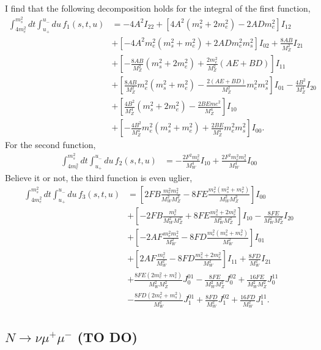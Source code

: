 \documentclass[11pt, a4paper]{article}
\begin{document}
%
I find that the following decomposition holds for the integral of the first
function,
%
\begin{align*}
%
\int_{4m_e^2}^{m_s^2}dt \int_{u_+}^{u_-} du\,f_1(s,t,u) &= -4A^2 I_{22} +
\left[4A^2(m_s^2+2m_e^2) - 2ADm_e^2\right]I_{12}\\
%
~~~~& + \left[ -4A^2m_e^2(m_s^2+m_e^2) + 2ADm_e^2m_s^2\right]I_{02} +
\frac{8AB}{M_Z^2}I_{21}\\
%
~~~~& + \left[ -\frac{8AB}{M_Z^2} (m_s^2+2m_e^2) + \frac{2m_e^2}{M_Z^2} (AE +
BD) \right]I_{11} \\
%
~~~~& + \left[ \frac{8AB}{M_Z^2}m_e^2(m_s^2+m_e^2) -
\frac{2(AE+BD)}{M_Z^2}m_e^2m_s^2 \right]I_{01} - \frac{4B^2}{M_Z^4}I_{20}\\
%
~~~~& + \left[ \frac{4B^2}{M_Z^4} (m_s^2+2m_e^2) -
\frac{2BEme^2}{M_Z^4}\right]I_{10} \\
%
~~~~& + \left[ -\frac{4B^2}{M_Z^4}m_e^2(m_s^2+m_e^2) +
\frac{2BE}{M_Z^4}m_e^2m_s^2 \right]I_{00}. 
%
\end{align*}
%
For the second function,
%
\begin{align*}
%
\int_{4m_e^2}^{m_s^2}dt \int_{u_+}^{u_-} du\,f_2(s,t,u) &=
-\frac{2F^2m_e^2}{M_W^4}I_{10} + \frac{2F^2m_e^2m_s^2}{M_W^4}I_{00}
%
\end{align*}
%
Believe it or not, the third function is even uglier, 
%
\begin{align*}
%
\int_{4m_e^2}^{m_s^2}dt \int_{u_+}^{u_-} du\,f_3(s,t,u) &=
\left[2FB\frac{m_e^2m_s^2}{M_W^2M_Z^2} -
8FE\frac{m_e^2(m_s^2+m_e^2)}{M_W^2M_Z^2}\right]I_{00}\\
%
~~~~&+ \left[-2FB\frac{m_e^2}{M_W^2M_Z^2} +
8FE\frac{m_s^2+2m_e^2}{M_W^2M_Z^2}\right]I_{10} - \frac{8FE}{M_W^2M_Z^2}I_{20}
\\
%
~~~~& + \left[-2AF\frac{m_e^2m_s^2}{M_W^2} -
8FD\frac{m_e^2(m_s^2+m_e^2)}{M_W^2}\right]I_{01}\\
%
~~~~&+ \left[2AF\frac{m_e^2}{M_W^2} -
8FD\frac{m_s^2+2m_e^2}{M_W^2}\right]I_{11} + \frac{8FD}{M_W^2}I_{21}\\
%
~~~~& + \frac{8FE(2m_e^2+m_s^2)}{M_W^2M_Z^2}J^{01}_0 -
\frac{8FE}{M_W^2M_Z^2}J^{02}_0 + \frac{16FE}{M_W^2M_Z^2}J^{11}_0 \\
%
~~~~& - \frac{8FD(2m_e^2+m_s^2)}{M_W^2}J^{01}_1 + \frac{8FD}{M_W^2}J^{02}_1 +
\frac{16FD}{M_W^2}J^{11}_1. 
%
\end{align*}



\subsection{$N \to \nu \mu^+\mu^-$  (TO DO)}
\end{document}
